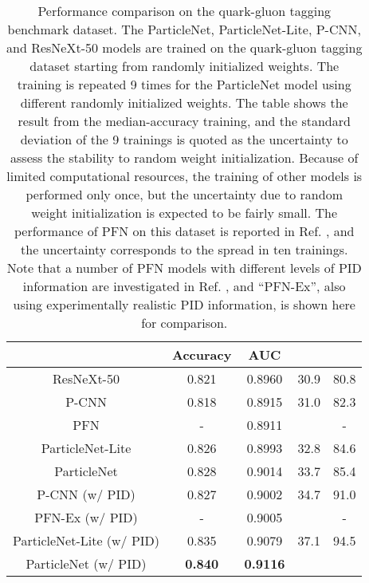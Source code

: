 \documentclass[aps,prd,longbibliography,reprint,amsmath,amssymb,amsfonts]{revtex4-1}
\begin{document}
\begin{table*}[htbp]
\centering
\caption{Performance comparison on the quark-gluon tagging benchmark dataset. The ParticleNet, ParticleNet-Lite, P-CNN, and ResNeXt-50 models are trained on the quark-gluon tagging dataset starting from randomly initialized weights. The training is repeated 9 times for the ParticleNet model using different randomly initialized weights. The table shows the result from the median-accuracy training, and the standard deviation of the 9 trainings is quoted as the uncertainty to assess the stability to random weight initialization. Because of limited computational resources, the training of other models is performed only once, but the uncertainty due to random weight initialization is expected to be fairly small. The performance of PFN on this dataset is reported in Ref. \cite{Komiske:2018cqr}, and the uncertainty corresponds to the spread in ten trainings. Note that a number of PFN models with different levels of PID information are investigated in Ref. \cite{Komiske:2018cqr}, and ``PFN-Ex'', also using experimentally realistic PID information, is shown here for comparison.}
\label{tab:results-qg}
\begin{ruledtabular}
\begin{tabular}{ccccc}
                & Accuracy & AUC &  &  \\
    \hline
    ResNeXt-50           & 0.821     & 0.8960            &  30.9              & 80.8       \\
    P-CNN                & 0.818     & 0.8915            &  31.0              & 82.3       \\
    PFN                  & -         & 0.8911            &        & -          \\
    ParticleNet-Lite     & 0.826     & 0.8993            &  32.8              & 84.6       \\
    ParticleNet          & 0.828     & 0.9014            &  33.7              & 85.4       \\
    \hline
    P-CNN (w/ PID)       & 0.827     & 0.9002            &  34.7              & 91.0               \\
    PFN-Ex (w/ PID)      & -         & 0.9005            &        & -                  \\
    ParticleNet-Lite (w/ PID) & 0.835 & 0.9079           &  37.1              & 94.5               \\
    ParticleNet (w/ PID) & \bf 0.840 & \bf 0.9116        &    &    \\
\end{tabular}
\end{ruledtabular}
\end{table*}
\end{document}
